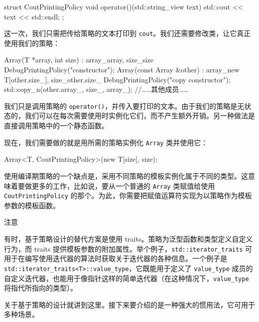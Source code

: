 \begin{codebox}[cpp]
struct CoutPrintingPolicy {
    void operator()(std::string_view text) { std::cout << text << std::endl; }
};
\end{codebox}

这一次，我们只需把传给策略的文本打印到 \texttt{cout}。我们还需要修改类，让它真正使用我们的策略：

\begin{codebox}[cpp]
    Array(T *array, int size) : array_{array}, size_{size} {
        DebugPrintingPolicy{}("constructor");
    }
    Array(const Array &other) : array_{new T[other.size_]}, size_{other.size_} {
        DebugPrintingPolicy{}("copy constructor");
        std::copy_n(other.array_, size_, array_);
    }
    //……其他成员……
\end{codebox}

我们只是调用策略的 \texttt{operator(\allowbreak{})\allowbreak{}}，并传入要打印的文本。由于我们的策略是无状态的，我们可以在每次需要使用时实例化它们，而不产生额外开销。另一种做法是直接调用策略中的一个静态函数。

现在，我们需要做的就是用所需的策略实例化 \texttt{Array} 类并使用它：

\begin{codebox}[text]
Array<T, CoutPrintingPolicy>(new T[size], size);
\end{codebox}

\label{idx:544}
使用编译期策略的一个缺点是，采用不同策略的模板实例化属于不同的类型。这意味着要做更多的工作，比如说，要从一个普通的 \texttt{Array} 类赋值给使用 \texttt{Cout\allowbreak{}Printing\allowbreak{}Policy} 的那个。为此，你需要把赋值运算符实现为以策略作为模板参数的模板函数。

\begin{myNotic}{注意}

有时，基于策略设计的替代方案是使用 traits。策略为泛型函数和类型定义自定义行为，而 traits 提供模板参数的附加属性。举个例子，\texttt{std::\allowbreak{}iterator\_\allowbreak{}traits} 可用于在编写使用迭代器的算法时获取关于迭代器的各种信息。一个例子是 \texttt{std::\allowbreak{}iterator\_\allowbreak{}traits<T>::\allowbreak{}value\_\allowbreak{}type}，它既能用于定义了 \texttt{value\_\allowbreak{}type} 成员的自定义迭代器，也能用于像指针这样的简单迭代器（在这种情况下，\texttt{value\_\allowbreak{}type} 将指代所指向的类型）。
\end{myNotic}

\label{idx:545}
关于基于策略的设计就讲到这里。接下来要介绍的是一种强大的惯用法，它可用于多种场景。

